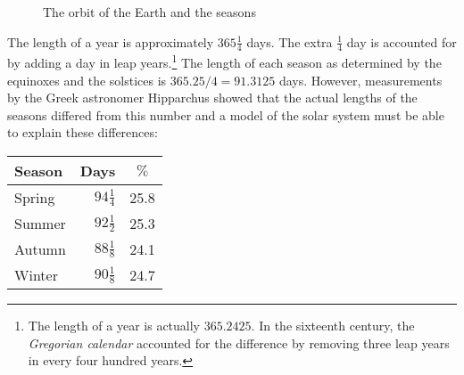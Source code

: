 \begin{figure}[b]
\begin{center}
\caption{The orbit of the Earth and the seasons}\label{f.circle}
\end{center}
\end{figure}

The length of a year is approximately $365 \frac{1}{4}$ days. The extra $\frac{1}{4}$ day is accounted for by adding a day in leap years.\footnote{The length of a year is actually $365.2425$. In the sixteenth century, the \emph{Gregorian calendar} accounted for the difference by removing three leap years in every four hundred years.} The length of each season as determined by the equinoxes and the solstices is $365.25/4=91.3125$ days. However, measurements by the Greek astronomer Hipparchus showed that the actual lengths of the seasons differed from this number and a model of the solar system must be able to explain these differences:
\begin{center}
\begin{sffamily}
\renewcommand{\arraystretch}{1.3}
\begin{tabular}{|l|r|r|}
\hline
Season & \multicolumn{1}{|c|}{Days}&\multicolumn{1}{|c|}{$\%$}\\\hline\hline
Spring & $94\frac{1}{4}$ & 25.8\\\hline
Summer & $92\frac{1}{2}$ & 25.3\\\hline
Autumn & $88\frac{1}{8}$ & 24.1\\\hline
Winter & $90\frac{1}{8}$ & 24.7\\\hline
\end{tabular}
\end{sffamily}
\end{center}

